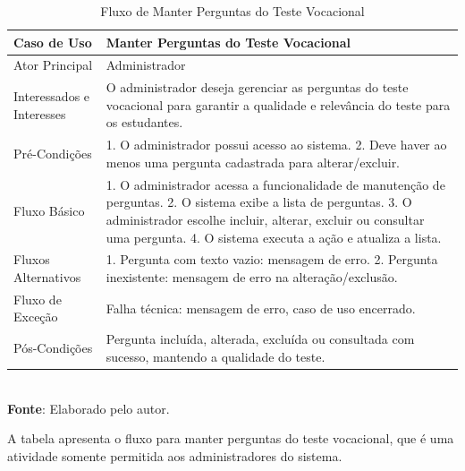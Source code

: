 \newpage
\begin{table}[h!]
\centering
\caption{Fluxo de Manter Perguntas do Teste Vocacional}
\begin{tabular}{|m{4cm}|m{11cm}|}
\hline
\textbf{Caso de Uso}   & \textbf{Manter Perguntas do Teste Vocacional} \\
\hline
Ator Principal & Administrador\\
\hline
Interessados e Interesses & O administrador deseja gerenciar as perguntas do teste vocacional para garantir a qualidade e relevância do teste para os estudantes. \\
\hline
Pré-Condições & 

1. O administrador possui acesso ao sistema.
2. Deve haver ao menos uma pergunta cadastrada para alterar/excluir. \\
\hline
Fluxo Básico & 

1. O administrador acessa a funcionalidade de manutenção de perguntas.
2. O sistema exibe a lista de perguntas.
3. O administrador escolhe incluir, alterar, excluir ou consultar uma pergunta.
4. O sistema executa a ação e atualiza a lista.
\\
\hline
Fluxos Alternativos & 

1. Pergunta com texto vazio: mensagem de erro.
2. Pergunta inexistente: mensagem de erro na alteração/exclusão.
\\
\hline
Fluxo de Exceção & Falha técnica: mensagem de erro, caso de uso encerrado. \\
\hline
Pós-Condições & Pergunta incluída, alterada, excluída ou consultada com sucesso, mantendo a qualidade do teste.\\
\hline
\end{tabular}
\label{table:casos-de-uso}
\\[1ex]
\footnotesize \textbf{Fonte}: Elaborado pelo autor.
\end{table}

A tabela apresenta o fluxo para manter perguntas do teste vocacional, que é uma atividade somente permitida aos administradores do sistema.

